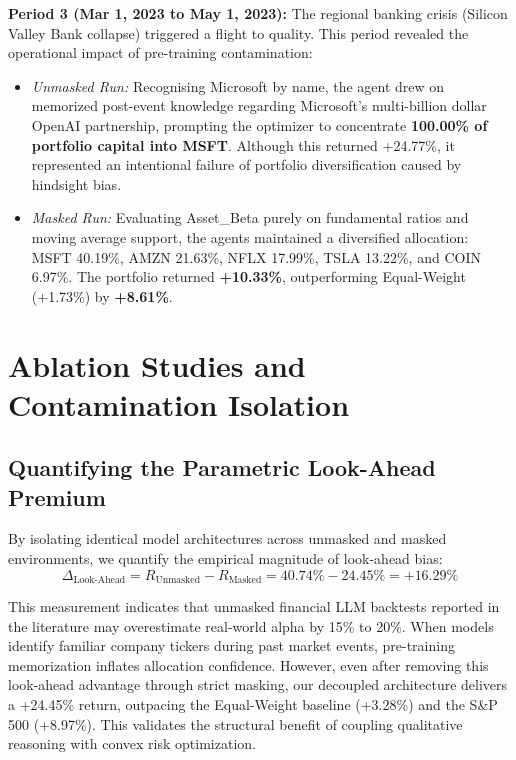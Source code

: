 \documentclass[conference]{IEEEtran}
\begin{document}
\textbf{Period 3 (Mar 1, 2023 to May 1, 2023):} The regional banking crisis (Silicon Valley Bank collapse) triggered a flight to quality. This period revealed the operational impact of pre-training contamination:
\begin{itemize}
    \item \textit{Unmasked Run:} Recognising Microsoft by name, the agent drew on memorized post-event knowledge regarding Microsoft's multi-billion dollar OpenAI partnership, prompting the optimizer to concentrate \textbf{100.00\% of portfolio capital into MSFT}. Although this returned +24.77\%, it represented an intentional failure of portfolio diversification caused by hindsight bias.
    \item \textit{Masked Run:} Evaluating Asset\_Beta purely on fundamental ratios and moving average support, the agents maintained a diversified allocation: MSFT 40.19\%, AMZN 21.63\%, NFLX 17.99\%, TSLA 13.22\%, and COIN 6.97\%. The portfolio returned \textbf{+10.33\%}, outperforming Equal-Weight (+1.73\%) by \textbf{+8.61\%}.
\end{itemize}

\section{Ablation Studies and Contamination Isolation}

\subsection{Quantifying the Parametric Look-Ahead Premium}

By isolating identical model architectures across unmasked and masked environments, we quantify the empirical magnitude of look-ahead bias:
\begin{equation}
\Delta_{\text{Look-Ahead}} = R_{\text{Unmasked}} - R_{\text{Masked}} = 40.74\% - 24.45\% = \mathbf{+16.29\%}
\label{eq:lookahead}
\end{equation}

This measurement indicates that unmasked financial LLM backtests reported in the literature may overestimate real-world alpha by 15\% to 20\%. When models identify familiar company tickers during past market events, pre-training memorization inflates allocation confidence. However, even after removing this look-ahead advantage through strict masking, our decoupled architecture delivers a +24.45\% return, outpacing the Equal-Weight baseline (+3.28\%) and the S\&P 500 (+8.97\%). This validates the structural benefit of coupling qualitative reasoning with convex risk optimization.
\end{document}
